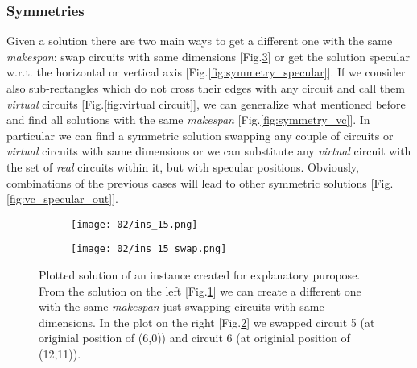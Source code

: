     \subsubsection{Symmetries} \label{sec:symmetries}

        Given a solution there are two main ways to get a different one with the same \textit{makespan}:
        swap circuits with same dimensions [Fig.\ref{fig:symmetry_swap}] or get the solution specular w.r.t. the horizontal 
        or vertical axis [Fig.\ref{fig:symmetry_specular}].
        If we consider also sub-rectangles which do not cross their edges with any circuit and call them 
        \textit{virtual} circuits [Fig.\ref{fig:virtual circuit}], we can generalize what mentioned before and find all solutions with 
        the same \textit{makespan} [Fig.\ref{fig:symmetry_vc}].
        In particular we can find a symmetric solution swapping any couple of circuits or \textit{virtual} circuits 
        with same dimensions or we can substitute any \textit{virtual} circuit with the set of \textit{real} circuits within it, 
        but with specular positions. Obviously, combinations of the previous cases will lead to other symmetric 
        solutions [Fig.\ref{fig:vc_specular_out}].

        \begin{figure}[H]
            \centering
            \begin{subfigure}[b]{0.45\textwidth}
                \centering 
                \texttt{[image: 02/ins\_15.png]}
                \caption{}
                \label{fig:ins_15_mod}
            \end{subfigure}
            \hfill
            \begin{subfigure}[b]{0.45\textwidth}
                \centering
                \texttt{[image: 02/ins\_15\_swap.png]}
                \caption{}
                \label{fig:ins_15_swap}
            \end{subfigure}
            \hfill
            \caption{
                Plotted solution of an instance created for explanatory puropose.
                From the solution on the left [Fig.\ref{fig:ins_15_mod}] we can create a different one
                with the same \textit{makespan} just swapping circuits with same dimensions. In
                the plot on the right [Fig.\ref{fig:ins_15_swap}] we swapped circuit 5 (at originial
                position of (6,0)) and circuit 6 (at originial position of (12,11)).
            }
            \label{fig:symmetry_swap}
        \end{figure}
       
